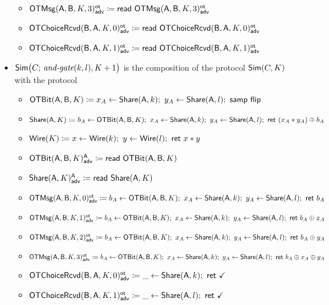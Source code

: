 \begin{itemize}
\begin{itemize}
\item {\color{blue} $\LeakOTMsg(\A,\B,K,3)^\ot_\adv \coloneqq \read{\LeakOTMsg(\A,\B,K,3)^\ot_\adv}$}\medskip
\item {\color{blue} $\LeakOTChoiceRcvd(\B,\A,K,0)^\ot_\adv \coloneqq \read{\LeakOTChoiceRcvd(\B,\A,K,0)^\ot_\adv}$}
\item {\color{blue} $\LeakOTChoiceRcvd(\B,\A,K,1)^\ot_\adv \coloneqq \read{\LeakOTChoiceRcvd(\B,\A,K,1)^\ot_\adv}$}
\end{itemize}
\item $\Sim\big(C; \, \andgate(k,l),K+1\big)$ is the composition of the protocol $\Sim(C,K)$ with the protocol
\begin{itemize}
\item $\OTBit(\A,\B,K) \coloneqq x_A \leftarrow \Share(\A,k); \ y_A \leftarrow \Share(\A,l); \ \samp{\flip}$
\item $\Share(\A,K) \coloneqq b_A \leftarrow \OTBit(\A,\B,K); \ x_A \leftarrow \Share(\A,k); \ y_A \leftarrow \Share(\A,l); \ \ret{(x_A * y_A) \oplus b_A}$
\item $\Wire(K) \coloneqq x \leftarrow \Wire(k); \ y \leftarrow \Wire(l); \ \ret{x * y}$\medskip
\item {\color{blue} $\LeakOTBit(\A,\B,K)^\A_\adv \coloneqq \read{\OTBit(\A,\B,K)}$}
\item {\color{blue} $\LeakShare(\A,K)^\A_\adv \coloneqq \read{\Share(\A,K)}$}\medskip
\item {\color{blue} $\LeakOTMsg(\A,\B,K,0)^\ot_\adv \coloneqq b_A \leftarrow \OTBit(\A,\B,K); \ x_A \leftarrow \Share(\A,k); \ y_A \leftarrow \Share(\A,l); \ \ret{b_A}$}
\item {\color{blue} $\LeakOTMsg(\A,\B,K,1)^\ot_\adv \coloneqq b_A \leftarrow \OTBit(\A,\B,K); \ x_A \leftarrow \Share(\A,k); \ y_A \leftarrow \Share(\A,l); \ \ret{b_A \oplus x_A}$}
\item {\color{blue} $\LeakOTMsg(\A,\B,K,2)^\ot_\adv \coloneqq b_A \leftarrow \OTBit(\A,\B,K); \ x_A \leftarrow \Share(\A,k); \ y_A \leftarrow \Share(\A,l); \ \ret{b_A \oplus y_A}$}
\item {\color{blue} $\LeakOTMsg(\A,\B,K,3)^\ot_\adv \coloneqq b_A \leftarrow \OTBit(\A,\B,K); \ x_A \leftarrow \Share(\A,k); \ y_A \leftarrow \Share(\A,l); \ \ret{b_A \oplus x_A \oplus y_A}$}\medskip
\item {\color{blue} $\LeakOTChoiceRcvd(\B,\A,K,0)^\ot_\adv \coloneqq \_ \leftarrow \Share(\A,k); \ \ret{\checkmark}$}
\item {\color{blue} $\LeakOTChoiceRcvd(\B,\A,K,1)^\ot_\adv \coloneqq \_ \leftarrow \Share(\A,l); \ \ret{\checkmark}$}
\end{itemize}
\end{itemize}

